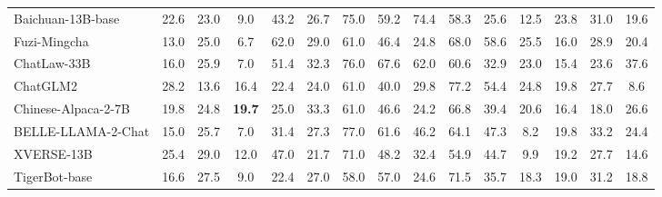 \begin{table*}[t]
\begin{tabular}{l|ccc|ccccc|cccccc}
Baichuan-13B-base   & 22.6          & 23.0          & 9.0           & 43.2          & 26.7          & 75.0          & 59.2          & 74.4          & 58.3          & 25.6          & 12.5          & 23.8          & 31.0          & 19.6          \\
Fuzi-Mingcha        & 13.0          & 25.0          & 6.7           & 62.0          & 29.0          & 61.0          & 46.4          & 24.8          & 68.0          & 58.6          & 25.5          & 16.0          & 28.9          & 20.4          \\
ChatLaw-33B         & 16.0          & 25.9          & 7.0           & 51.4          & 32.3          & 76.0          & 67.6          & 62.0          & 60.6          & 32.9          & 23.0          & 15.4          & 23.6          & 37.6          \\
ChatGLM2            & 28.2          & 13.6          & 16.4          & 22.4          & 24.0          & 61.0          & 40.0          & 29.8          & 77.2          & 54.4          & 24.8          & 19.8          & 27.7          & 8.6           \\
Chinese-Alpaca-2-7B & 19.8          & 24.8          & \textbf{19.7} & 25.0          & 33.3          & 61.0          & 46.6          & 24.2          & 66.8          & 39.4          & 20.6          & 16.4          & 18.0          & 26.6          \\
BELLE-LLAMA-2-Chat  & 15.0          & 25.7          & 7.0           & 31.4          & 27.3          & 77.0          & 61.6          & 46.2          & 64.1          & 47.3          & 8.2           & 19.8          & 33.2          & 24.4          \\
XVERSE-13B          & 25.4          & 29.0          & 12.0          & 47.0          & 21.7          & 71.0          & 48.2          & 32.4          & 54.9          & 44.7          & 9.9           & 19.2          & 27.7          & 14.6          \\
TigerBot-base       & 16.6          & 27.5          & 9.0           & 22.4          & 27.0          & 58.0          & 57.0          & 24.6          & 71.5          & 35.7          & 18.3          & 19.0          & 31.2          & 18.8  \\
\hline
\end{tabular}
\label{zero-1}
\vspace{-5mm}
\end{table*}

